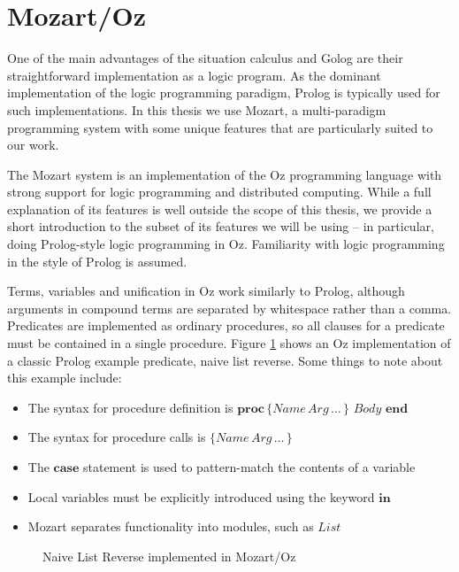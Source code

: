 \section{Mozart/Oz\label{sec:Background:Mozart/Oz}}

One of the main advantages of the situation calculus and Golog are
their straightforward implementation as a logic program. As the dominant
implementation of the logic programming paradigm, Prolog is typically
used for such implementations. In this thesis we use Mozart, a multi-paradigm
programming system with some unique features that are particularly
suited to our work.

The Mozart system \citep{vanroy99mozart} is an implementation of
the Oz programming language \citep{vanRoyHaridi04ctm} with strong
support for logic programming and distributed computing. While a full
explanation of its features is well outside the scope of this thesis,
we provide a short introduction to the subset of its features we will
be using -- in particular, doing Prolog-style logic programming in
Oz. Familiarity with logic programming in the style of Prolog is assumed.

Terms, variables and unification in Oz work similarly to Prolog, although
arguments in compound terms are separated by whitespace rather than
a comma. Predicates are implemented as ordinary procedures, so all
clauses for a predicate must be contained in a single procedure. Figure
\ref{fig:Background:Naive-List-Reverse} shows an Oz implementation
of a classic Prolog example predicate, naive list reverse. Some things
to note about this example include:

\begin{itemize}
\item The syntax for procedure definition is $\mathbf{proc}\,\{Name\, Arg\,\dots\,\}\,\, Body\,\,\mathbf{end}$ 
\item The syntax for procedure calls is $\{Name\, Arg\,\dots\,\}$ 
\item The $\mathbf{case}$ statement is used to pattern-match the contents
of a variable 
\item Local variables must be explicitly introduced using the keyword $\mathbf{in}$ 
\item Mozart separates functionality into modules, such as $List$ 
\end{itemize}
%
\begin{figure}[t]

\caption{Naive List Reverse implemented in Mozart/Oz\label{fig:Background:Naive-List-Reverse}}

\end{figure}


